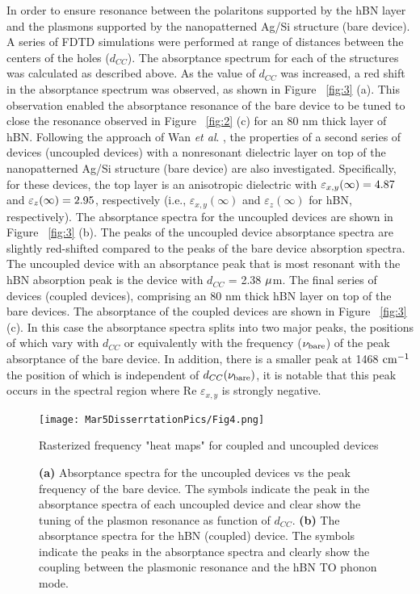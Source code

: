 \documentclass[12pt]{report}
\begin{document}
    In order to ensure resonance between the polaritons supported by the hBN layer and the plasmons supported by the nanopatterned Ag/Si structure (bare device). A series of FDTD simulations were performed at range of distances between the centers of the holes ($d_{CC}$). The absorptance spectrum for each of the structures was calculated as described above. As the value of $d_{CC}$ was increased, a red shift in the absorptance spectrum was observed, as shown in Figure ~\ref{fig:3} (a). This observation enabled the absorptance resonance of the bare device to be tuned to close the resonance observed in Figure ~\ref{fig:2} (c) for an 80 nm thick layer of hBN. Following the approach of Wan \textit{et al}. \cite{Wan:16}, the properties of a second series of devices (uncoupled devices) with a nonresonant dielectric layer on top of the nanopatterned Ag/Si structure (bare device) are also investigated. Specifically, for these devices, the top layer is an anisotropic dielectric with $\varepsilon_{x,y}(\infty)= \rm{4.87}$ and $\varepsilon_{z}(\infty)= \rm{2.95}$, respectively (i.e., $\varepsilon_{x,y}(\infty)$ and $\varepsilon_{z}(\infty)$ for hBN, respectively). The absorptance spectra for the uncoupled devices are shown in Figure ~\ref{fig:3} (b). The peaks of the uncoupled device absorptance spectra are slightly red-shifted compared to the peaks of the bare device absorption spectra. The uncoupled device with an absorptance peak that is most resonant with the hBN absorption peak is the device with $d_{CC}$ = 2.38 $\rm \mu$m. The final series of devices (coupled devices), comprising an 80 nm thick hBN layer on top of the bare devices. The absorptance of the coupled devices are shown in Figure  ~\ref{fig:3} (c). In this case the absorptance spectra splits into two major peaks, the positions of which vary with $d_{CC}$ or equivalently with the frequency ($\nu_{\rm{bare}}$) of the peak absorptance of the bare device. In addition, there is a smaller peak at 1468 $\rm cm^{-1}$ the position of which is independent of $d_{CC}(\nu_{\rm{bare}})$, it is notable that this peak occurs in the spectral region where Re $\varepsilon_{x,y}$ is strongly negative.

      \begin{figure}[!htb]
        \centering\texttt{[image: Mar5DisserrtationPics/Fig4.png]}
        \caption{Rasterized frequency "heat maps" for coupled and uncoupled devices}
        \caption*{\textbf{(a)} Absorptance spectra for the uncoupled devices vs the peak frequency of the bare device. The symbols indicate the peak in the absorptance spectra of each uncoupled device and clear show the tuning of the plasmon resonance as function of $d_{CC}$. \textbf{(b)} The absorptance spectra for the hBN (coupled) device. The symbols indicate the peaks in the absorptance spectra and clearly show the coupling between the plasmonic resonance and the hBN TO phonon mode.}
        \label{fig:4}
      \end{figure}
\end{document}
